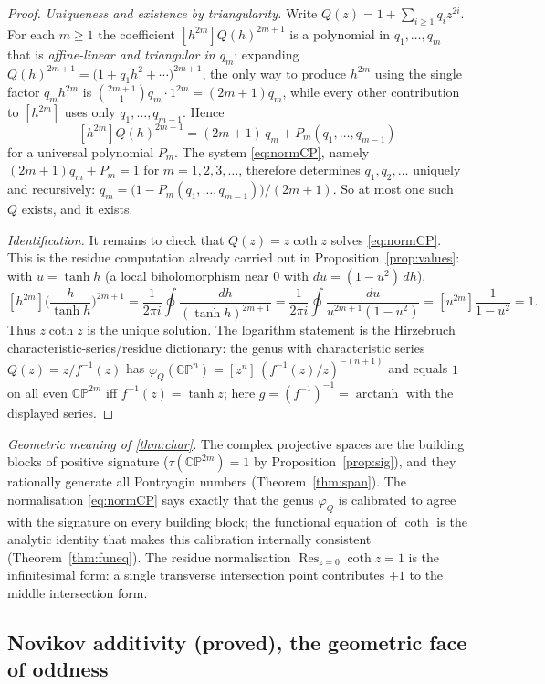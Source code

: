 \documentclass[12pt]{article}
\theoremstyle{definition}
\begin{document}
\begin{proof}
\emph{Uniqueness and existence by triangularity.} Write $Q(z)=1+\sum_{i\ge1}q_iz^{2i}$.
For each $m\ge1$ the coefficient $[h^{2m}]Q(h)^{2m+1}$ is a polynomial in $q_1,\dots,q_m$
that is \emph{affine-linear and triangular in $q_m$}: expanding
$Q(h)^{2m+1}=\big(1+q_1h^2+\cdots\big)^{2m+1}$, the only way to produce $h^{2m}$ using the
single factor $q_mh^{2m}$ is $\binom{2m+1}{1}q_m\cdot 1^{2m}=(2m+1)q_m$, while every other
contribution to $[h^{2m}]$ uses only $q_1,\dots,q_{m-1}$. Hence
\[
[h^{2m}]Q(h)^{2m+1}=(2m+1)\,q_m+P_m(q_1,\dots,q_{m-1})
\]
for a universal polynomial $P_m$. The system \eqref{eq:normCP}, namely
$(2m+1)q_m+P_m=1$ for $m=1,2,3,\dots$, therefore determines $q_1,q_2,\dots$ uniquely and
recursively: $q_m=\big(1-P_m(q_1,\dots,q_{m-1})\big)/(2m+1)$. So at most one such $Q$
exists, and it exists.

\emph{Identification.} It remains to check that $Q(z)=z\coth z$ solves \eqref{eq:normCP}.
This is the residue computation already carried out in Proposition~\ref{prop:values}:
with $u=\tanh h$ (a local biholomorphism near $0$ with $du=(1-u^2)\,dh$),
\[
[h^{2m}]\Big(\frac{h}{\tanh h}\Big)^{2m+1}
=\frac{1}{2\pi i}\oint\frac{dh}{(\tanh h)^{2m+1}}
=\frac{1}{2\pi i}\oint\frac{du}{u^{2m+1}(1-u^2)}
=[u^{2m}]\frac{1}{1-u^2}=1 .
\]
Thus $z\coth z$ is the unique solution. The logarithm statement is the Hirzebruch
characteristic-series/residue dictionary: the genus with characteristic series $Q(z)=z/f^{-1}(z)$
has $\varphi_Q(\mathbb{CP}^{n})=[z^{n}]\,(f^{-1}(z)/z)^{-(n+1)}$ and equals $1$ on all even
$\mathbb{CP}^{2m}$ iff $f^{-1}(z)=\tanh z$; here $g=(f^{-1})^{-1}=\operatorname{arctanh}$
with the displayed series.
\end{proof}

\noindent\emph{Geometric meaning of \eqref{thm:char}.} The complex projective spaces are
the building blocks of positive signature ($\tau(\mathbb{CP}^{2m})=1$ by
Proposition~\ref{prop:sig}), and they rationally generate all Pontryagin numbers
(Theorem~\ref{thm:span}). The normalisation \eqref{eq:normCP} says exactly that the genus
$\varphi_Q$ is calibrated to agree with the signature on every building block; the
functional equation of $\coth$ is the analytic identity that makes this calibration
internally consistent (Theorem~\ref{thm:funeq}). The residue normalisation
$\operatorname{Res}_{z=0}\coth z=1$ is the infinitesimal form: a single transverse
intersection point contributes $+1$ to the middle intersection form.

\subsection*{Novikov additivity (proved), the geometric face of oddness}
\end{document}
